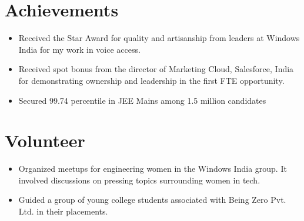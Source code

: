 \documentclass[letterpaper,11pt]{article}
\newcommand{\listItem}[1]{
  \item\small{{#1 \vspace{-2pt}}
  }
}
\newcommand{\resumeSubHeadingListStart}{\begin{itemize}[leftmargin=*]}
\newcommand{\resumeSubHeadingListEnd}{\end{itemize}}
\newcommand{\resumeListItem}[1]{\listItem{#1}\vspace{-4pt}}
\begin{document}
\section{Achievements}
 \resumeSubHeadingListStart
   \resumeListItem
      {Received the Star Award for quality and artisanship from leaders at Windows India for my work in voice access.}
    \resumeListItem
      {Received spot bonus from the director of Marketing Cloud, Salesforce, India for demonstrating ownership and leadership in the first FTE opportunity.}
    \resumeListItem
      {Secured 99.74 percentile in JEE Mains among 1.5 million candidates}
 \resumeSubHeadingListEnd
 
 
\section{Volunteer}
 \resumeSubHeadingListStart
   \resumeListItem
      {Organized meetups for engineering women in the Windows India group. It involved discussions on pressing topics surrounding women in tech.}
    \resumeListItem
      {Guided a group of young college students associated with Being Zero Pvt. Ltd. in their placements.}
 \resumeSubHeadingListEnd
 
 
\end{document}
